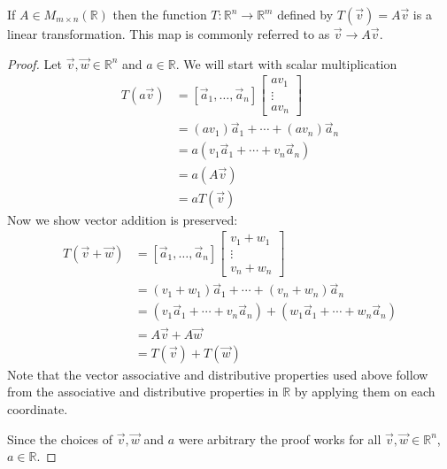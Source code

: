 \begin{proposition} If $A \in M_{m \times n}(\mathbb{R})$ then the function 
$T:\mathbb{R}^n \to \mathbb{R}^m$ defined by $T(\vec{v})=A\vec{v}$ is a linear 
transformation. This map is commonly referred to as $\vec{v} \to A\vec{v}$.
\end{proposition}
\begin{proof}
Let $\vec{v},\vec{w} \in \mathbb{R}^n$ and $a \in \mathbb{R}$. 
We will start with scalar multiplication 
\begin{align*}
T(a\vec{v})
&=[\vec{a}_1, \ldots, \vec{a}_n]
\begin{bmatrix}av_1\\ \vdots \\ av_n\end{bmatrix}\\
&=(av_1)\vec{a}_1+\cdots+(av_n)\vec{a}_n\\
&=a(v_1\vec{a}_1+\cdots+v_n\vec{a}_n)\\
&=a(A\vec{v})\\
&=aT(\vec{v})
\end{align*}
Now we show vector addition is preserved:
\begin{align*}
T(\vec{v}+\vec{w})
&=[\vec{a}_1, \ldots, \vec{a}_n]\begin{bmatrix}v_1+w_1\\ \vdots \\ v_n+w_n\end{bmatrix}\\
&=(v_1+w_1)\vec{a}_1+\cdots+(v_n+w_n)\vec{a}_n\\
&=(v_1\vec{a}_1+\cdots+v_n\vec{a}_n)+(w_1\vec{a}_1+\cdots+w_n\vec{a}_n)\\
&=A\vec{v}+A\vec{w}\\
&=T(\vec{v})+T(\vec{w})
\end{align*}
Note that the vector associative and distributive properties used above 
follow from the associative and distributive properties in $\mathbb{R}$ 
by applying them on each coordinate.

Since the choices of $\vec{v},\vec{w}$ and $a$ were arbitrary the proof works 
for all $\vec{v},\vec{w} \in \mathbb{R}^n$, $a \in \mathbb{R}$.
\end{proof}
